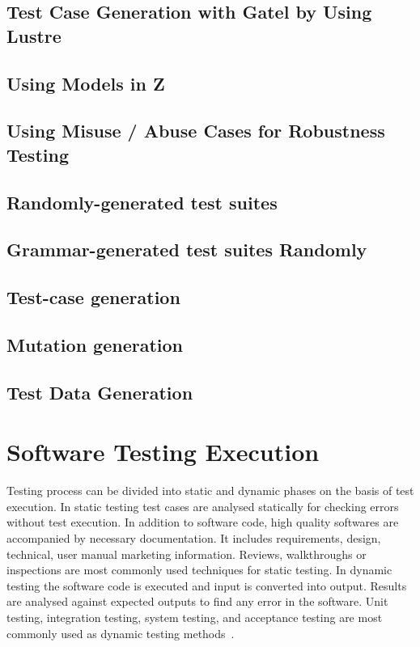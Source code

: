 \subsection{Test Case Generation with Gatel by Using Lustre}
\subsection{Using Models in Z}
\subsection{Using Misuse / Abuse Cases for Robustness Testing}
\subsection{Randomly-generated test suites} %
\subsection{Grammar-generated test suites Randomly}%
\subsection{Test-case generation} %
\subsection{Mutation generation} %
\subsection{Test Data Generation} %











\section{Software Testing Execution}
Testing process can be divided into static and dynamic phases on the basis of test execution. In static testing test cases are analysed statically for checking errors without test execution. In addition to software code, high quality softwares are accompanied by necessary documentation. It includes requirements, design, technical, user manual marketing information. Reviews, walkthroughs or inspections are most commonly used techniques for static testing. In dynamic testing the software code is executed and input is converted into output. Results are analysed against expected outputs to find any error in the software. Unit testing, integration testing, system testing, and acceptance testing are most commonly used as dynamic testing methods~\cite{fairley1978tutorial}.


